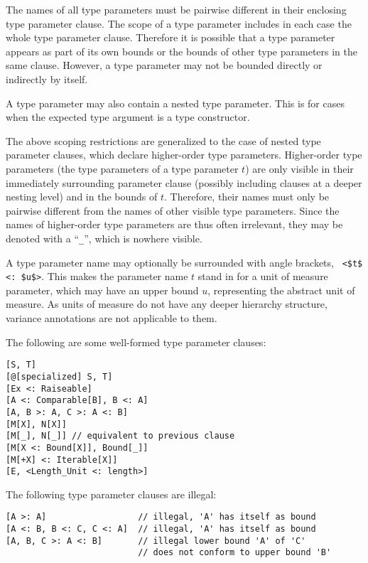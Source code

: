 The names of all type parameters must be pairwise different in their enclosing type parameter clause. The scope of a type parameter includes in each case the whole type parameter clause. Therefore it is possible that a type parameter appears as part of its own bounds or the bounds of other type parameters in the same clause. However, a type parameter may not be bounded directly or indirectly by itself. 

A type parameter may also contain a nested type parameter. This is for cases when the expected type argument is a type constructor. 

The above scoping restrictions are generalized to the case of nested type parameter clauses, which declare higher-order type parameters. Higher-order type parameters (the type parameters of a type parameter $t$) are only visible in their immediately surrounding parameter clause (possibly including clauses at a deeper nesting level) and in the bounds of $t$. Therefore, their names must only be pairwise different from the names of other visible type parameters. Since the names of higher-order type parameters are thus often irrelevant, they may be denoted with a ``\lstinline!_!'', which is nowhere visible. 

A type parameter name may optionally be surrounded with angle brackets, ~\lstinline!<$t$ <: $u$>!. This makes the parameter name $t$ stand in for a unit of measure parameter, which may have an upper bound $u$, representing the abstract unit of measure. As units of measure do not have any deeper hierarchy structure, variance annotations are not applicable to them. 

\example The following are some well-formed type parameter clauses:
\begin{lstlisting}
[S, T]
[@[specialized] S, T]
[Ex <: Raiseable]
[A <: Comparable[B], B <: A]
[A, B >: A, C >: A <: B]
[M[X], N[X]]
[M[_], N[_]] // equivalent to previous clause
[M[X <: Bound[X]], Bound[_]]
[M[+X] <: Iterable[X]]
[E, <Length_Unit <: length>]
\end{lstlisting}
The following type parameter clauses are illegal:
\begin{lstlisting}
[A >: A]                  // illegal, 'A' has itself as bound
[A <: B, B <: C, C <: A]  // illegal, 'A' has itself as bound
[A, B, C >: A <: B]       // illegal lower bound 'A' of 'C'
                          // does not conform to upper bound 'B'
\end{lstlisting}








